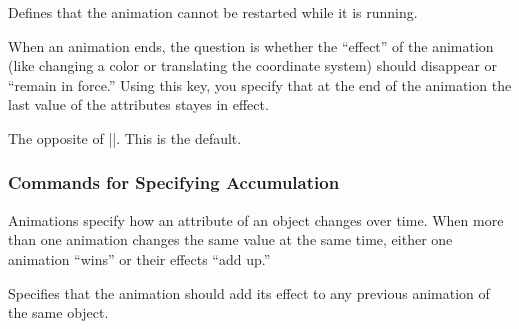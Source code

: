 \begin{command}{\pgfsys@animation@restart@whennotactive}
  Defines that the animation cannot be restarted while it is running.
\begin{codeexample}[width=2cm]
\end{codeexample}
\end{command}

\begin{command}{\pgfsys@animation@freezeatend{}}
  When an animation ends, the question is whether the ``effect'' of
  the animation (like changing a color or translating the coordinate
  system) should disappear or ``remain in force.'' Using this key, you
  specify that at the end of the animation the last value of the
  attributes stayes in effect.
\begin{codeexample}[width=2cm]
\end{codeexample}
\end{command}

\begin{command}{\pgfsys@animation@removeatend{}}
  The opposite of |\pgfsys@animation@freezeatend|. This is the default.
\begin{codeexample}[width=2cm]
\end{codeexample}
\end{command}


\subsubsection{Commands for Specifying Accumulation}

Animations specify how an attribute of an object changes over
time. When more than one animation changes the same value at the same
time, either one animation ``wins'' or their effects ``add up.''

\begin{command}{\pgfsys@animation@sum{}}
  Specifies that the animation should add its effect to any previous
  animation of the same object.
\begin{codeexample}[width=2cm]
\end{codeexample}
\end{command}

